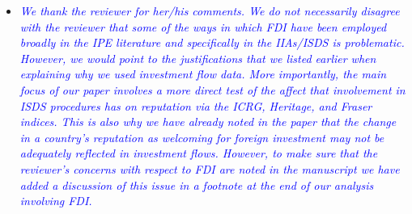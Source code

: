 \begin{enumerate}
	\begin{itemize}
		\item \textcolor{blue}{ \emph{
		We thank the reviewer for her/his comments. We do not necessarily disagree with the reviewer that some of the ways in which FDI have been employed broadly in the IPE literature and specifically in the IIAs/ISDS is problematic. However, we would point to the justifications that we listed earlier when explaining why we used investment flow data. More importantly, the main focus of our paper involves a more direct test of the affect that involvement in ISDS procedures has on reputation via the ICRG, Heritage, and Fraser indices. This is also why we have already noted in the paper that the change in a country's reputation as welcoming for foreign investment may not be adequately reflected in investment flows. However, to make sure that the reviewer's concerns with respect to FDI are noted in the manuscript we have added a discussion of this issue in a footnote at the end of our analysis involving FDI. 
		}}
	\end{itemize}
\end{enumerate}
